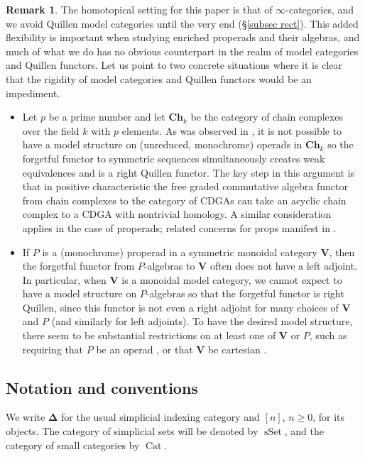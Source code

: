 \documentclass{amsart}
\numberwithin{theorem}{subsection}
\theoremstyle{definition}
\newtheorem{remark}[theorem]{Remark}
\newcommand{\xCat}{\operatorname{Cat}}
\newcommand{\xsSet}{\operatorname{sSet}}
\newcommand{\simp}{\mathbf{\Delta}}
\begin{document}
\begin{remark}\label{remark homotopical setting}
The homotopical setting for this paper is that of $\infty$-categories, and we avoid Quillen model categories until the very end (\S\ref{subsec rect}).
This added flexibility is important when studying enriched properads and their algebras, and much of what we do has no obvious counterpart in the realm of model categories and Quillen functors.
Let us point to two concrete situations where it is clear that the rigidity of model categories and Quillen functors would be an impediment.
\begin{itemize}[leftmargin=*]
\item Let $p$ be a prime number and let $\mathbf{Ch}_k$ be the category of chain complexes over the field $k$ with $p$ elements.
As was observed in \cite[3.3.3]{BergerMoerdijk}, it is not possible to have a model structure on (unreduced, monochrome) operads in $\mathbf{Ch}_k$ so the forgetful functor to symmetric sequences simultaneously creates weak equivalences and is a right Quillen functor.
The key step in this argument is that in positive characteristic the free graded commutative algebra functor from chain complexes to the category of CDGAs can take an acyclic chain complex to a CDGA with nontrivial homology.
A similar consideration applies in the case of properads; related concerns for props manifest in \cite[4.10]{Fresse:PMCHIS}.
\item If $P$ is a (monochrome) properad in a symmetric monoidal category $\mathbf{V}$, then the forgetful functor from $P$-algebras to $\mathbf{V}$ often does not have a left adjoint.
In particular, when $\mathbf{V}$ is a monoidal model category, we cannot expect to have a model structure on $P$-algebras so that the forgetful functor is right Quillen, since this functor is not even a right adjoint for many choices of $\mathbf{V}$ and $P$ (and similarly for left adjoints).
To have the desired model structure, there seem to be substantial restrictions on at least one of $\mathbf{V}$ or $P$, such as requiring that $P$ be an operad \cite{BergerMoerdijk}, or that $\mathbf{V}$ be cartesian \cite[Theorem 1.4]{JohnsonYau:OHIACP}.
\end{itemize}
\end{remark}

\subsection{Notation and conventions}
We write $\simp$ for the usual simplicial indexing category and $[n]$, $n\geq 0$, for its objects.
The category of simplicial sets will be denoted by $\xsSet$, and the category of small categories by $\xCat$.
\end{document}
